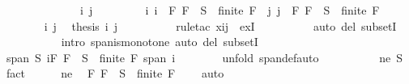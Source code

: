 \begin{isabellebody}
\ \ \ \ \isamarkupfalse%
\ {\isacharminus}\isanewline
\ \ \ \ \ \ \isamarkupfalse%
\ i\ j\ \isanewline
\ \ \ \ \ \ \isamarkupfalse%
\ i{\isacharcolon}\ {\isachardoublequoteopen}i\ {\isasymin}\ {\isacharbraceleft}F{\isachardot}\ F\ {\isasymsubseteq}\ S\ {\isasymand}\ finite\ F{\isacharbraceright}{\isachardoublequoteclose}\ \ j{\isacharcolon}\ {\isachardoublequoteopen}j\ {\isasymin}\ {\isacharbraceleft}F{\isachardot}\ F\ {\isasymsubseteq}\ S\ {\isasymand}\ finite\ F{\isacharbraceright}{\isachardoublequoteclose}\isanewline
\ \ \ \ \ \ \isamarkupfalse%
\ i\ j\ \isamarkupfalse%
\ {\isachardoublequoteopen}{\isacharquery}thesis\ i\ j{\isachardoublequoteclose}\isanewline
\ \ \ \ \ \ \ \ \isamarkupfalse%
\ {\isacharparenleft}rule{\isacharunderscore}tac\ x{\isacharequal}{\isachardoublequoteopen}i{\isasymunion}j{\isachardoublequoteclose}\ \ exI{\isacharparenright}\isanewline
\ \ \ \ \ \ \ \ \isamarkupfalse%
\ {\isacharparenleft}auto\ del{\isacharcolon}\ subsetI{\isacharparenright}\isanewline
\ \ \ \ \ \ \ \ \ \isamarkupfalse%
\ {\isacharparenleft}intro\ span{\isacharunderscore}is{\isacharunderscore}monotone{\isacharcomma}\ auto\ del{\isacharcolon}\ subsetI{\isacharparenright}{\isacharplus}\isanewline
\ \ \ \ \isamarkupfalse%
\isanewline
\ \ \isamarkupfalse%
\isanewline
\ \ \ \ \isamarkupfalse%
\ {\isachardoublequoteopen}span\ S{\isacharequal}{\isacharparenleft}{\isasymUnion}\ i{\isasymin}{\isacharbraceleft}F{\isachardot}\ F\ {\isasymsubseteq}\ S\ {\isasymand}\ finite\ F{\isacharbraceright}{\isachardot}\ span\ i{\isacharparenright}{\isachardoublequoteclose}\isanewline
\ \ \ \ \ \ \isamarkupfalse%
\ {\isacharparenleft}unfold\ span{\isacharunderscore}def{\isacharcomma}auto{\isacharparenright}\isanewline
\ \ \isamarkupfalse%
\ \isanewline
\ \ \ \ \isamarkupfalse%
\ ne{\isacharcolon}\ {\isachardoublequoteopen}S{\isasymnoteq}{\isacharbraceleft}{\isacharbraceright}{\isachardoublequoteclose}\ \isamarkupfalse%
\ fact\isanewline
\ \ \ \ \isamarkupfalse%
\ ne\ \isamarkupfalse%
\ {\isachardoublequoteopen}{\isacharbraceleft}F{\isachardot}\ F\ {\isasymsubseteq}\ S\ {\isasymand}\ finite\ F{\isacharbraceright}\ {\isasymnoteq}\ {\isacharbraceleft}{\isacharbraceright}{\isachardoublequoteclose}\ \isamarkupfalse%
\ auto\isanewline
\ \ \isamarkupfalse%

\end{isabellebody}
